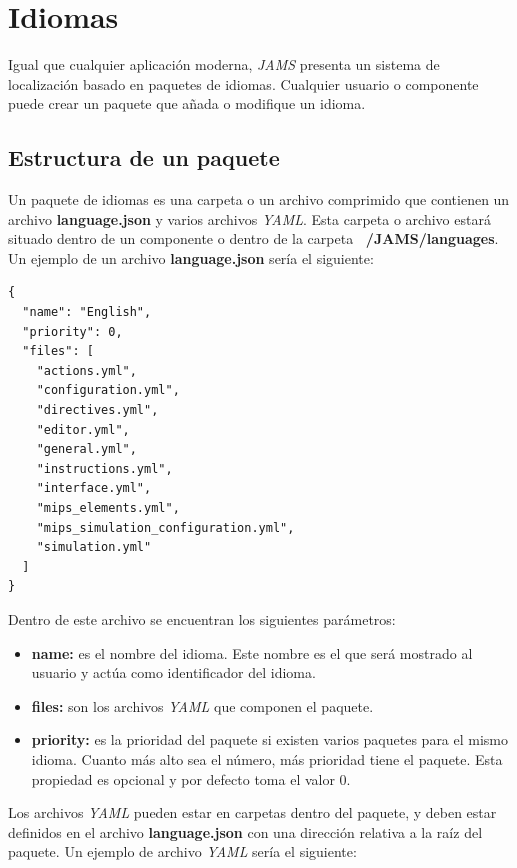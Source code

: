 \section{Idiomas}\label{sec:idiomas}

Igual que cualquier aplicación moderna, \textit{JAMS} presenta un sistema de
localización basado en paquetes de idiomas.
Cualquier usuario o componente puede crear un paquete que añada
o modifique un idioma.

\subsection{Estructura de un paquete}\label{subsec:estructura-de-un-paquete}

Un paquete de idiomas es una carpeta o un archivo comprimido
que contienen un archivo \textbf{language.json} y varios archivos \textit{YAML}.
Esta carpeta o archivo estará situado dentro de un componente
o dentro de la carpeta \textbf{~/JAMS/languages}.
Un ejemplo de un archivo \textbf{language.json} sería el siguiente:

\begin{lstlisting}[frame=single,label={lst:language.json}]
{
  "name": "English",
  "priority": 0,
  "files": [
    "actions.yml",
    "configuration.yml",
    "directives.yml",
    "editor.yml",
    "general.yml",
    "instructions.yml",
    "interface.yml",
    "mips_elements.yml",
    "mips_simulation_configuration.yml",
    "simulation.yml"
  ]
}
\end{lstlisting}

\noindent Dentro de este archivo se encuentran los siguientes parámetros:
\begin{itemize}
    \item \textbf{name:} es el nombre del idioma.
    Este nombre es el que será mostrado al usuario
    y actúa como identificador del idioma.
    \item \textbf{files:} son los archivos \textit{YAML} que componen el paquete.
    \item \textbf{priority:} es la prioridad del paquete si existen varios
    paquetes para el mismo idioma.
    Cuanto más alto sea el número, más prioridad tiene el paquete.
    Esta propiedad es opcional y por defecto toma el valor 0.
\end{itemize}

\noindent Los archivos \textit{YAML} pueden estar en carpetas dentro del paquete,
y deben estar definidos en el archivo \textbf{language.json} con una
dirección relativa a la raíz del paquete.
Un ejemplo de archivo \textit{YAML} sería el siguiente:

